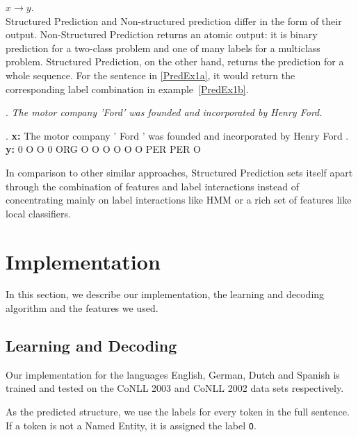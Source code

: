 \documentclass[11pt]{article}
\newcommand{\namedentity}{Named Entity}
\newcommand{\Oo}{\texttt O}
\begin{document}
$ x \rightarrow y $. \\

Structured Prediction and Non-structured prediction differ in the form of their output.
Non-Structured Prediction returns an atomic output: it is binary prediction for a two-class problem and one of many labels for a multiclass problem. 
Structured Prediction, on the other hand, returns the prediction for a whole sequence. 
For the sentence in \ref{PredEx1a}, it would return the corresponding label combination in example~\ref{PredEx1b}. 

\begin{figure*}[ht]

\ex. \emph{The motor company 'Ford' was founded and incorporated  by Henry Ford.} \label{PredEx1a}
 
\exg. \textbf{x:} The motor company ' Ford ' was founded and incorporated by Henry Ford .\\
      \textbf{y:}  0   O      O     0 ORG  O  O     O     O       O        O PER   PER  O  \label{PredEx1b} \\
\caption{Input and predicted structure for the Named Entity Recognition task.}

\end{figure*}

In comparison to other similar approaches, Structured Prediction sets itself apart through the combination of features and label interactions instead
of concentrating mainly on label interactions like HMM or a rich set of features like local classifiers. 

\section{Implementation}
In this section, we describe our implementation, the learning and decoding algorithm and the features we used.


\subsection{Learning and Decoding}

Our implementation for the languages English, German, Dutch and Spanish is trained and tested on the CoNLL 2003 and CoNLL 2002 data sets respectively. 

As the predicted structure, we use the labels for every token in the full sentence. If a token is not a \namedentity, it is assigned the label \Oo.
\end{document}
